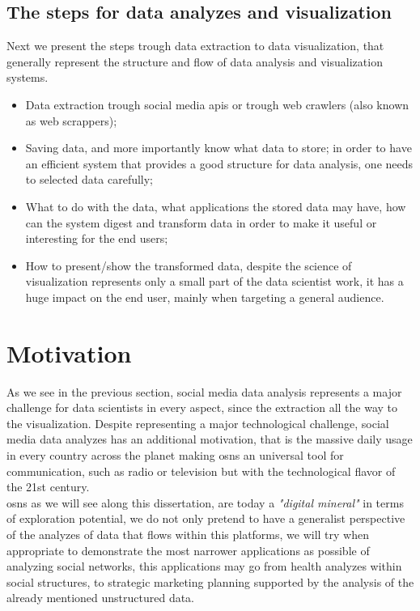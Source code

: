 \subsection*{The steps for data analyzes and visualization}

Next we present the steps trough data extraction to data visualization, that generally represent the structure and flow of data analysis and visualization systems.

\begin{itemize}
\item Data extraction trough social media \glspl{api} or trough web crawlers (also known as web scrappers);
\item Saving data, and more importantly know what data to store; in order to have an efficient system that provides a good structure for data analysis, one needs
to selected data carefully;
\item What to do with the data, what applications the stored data may have, how can the system digest and transform data in order to make it useful or interesting for the end users;
\item How to present/show the transformed data, despite the science of visualization represents only a small part of the data scientist work, it has a huge impact on the end user, mainly when targeting a general audience.
\end{itemize}

\section{Motivation}
As we see in the previous section, social media data analysis represents a major challenge for data scientists in every aspect, since the extraction all the way to the visualization. Despite representing a major technological challenge, social media data analyzes has an additional motivation, that is the massive daily usage in every country across the planet making \glspl{osn} an universal tool for communication, such as radio or television but with the technological flavor of the 21st century.\\
\indent \glspl{osn} as we will see along this dissertation, are today a \textit{"digital mineral"} in terms of exploration potential, we do not only pretend to have a generalist perspective of the analyzes of data that flows within this platforms, we will try when appropriate to demonstrate the most narrower applications as possible of analyzing social networks, this applications may go from health analyzes within social structures, to strategic marketing planning supported by the analysis of the already mentioned unstructured data.


